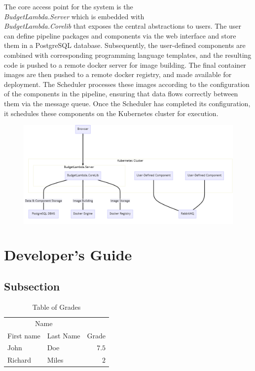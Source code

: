\documentclass[fleqn,10pt]{SelfArx} %
\begin{document}
The core access point for the system is the \\ \emph{BudgetLambda.Server} which is embedded with \\ \emph{BudgetLambda.Corelib} that exposes the central abstractions to users. The user can define pipeline packages and components via the web interface and store them in a PostgreSQL database. Subsequently, the user-defined components are combined with corresponding programming language templates, and the resulting code is pushed to a remote docker server for image building. The final container images are then pushed to a remote docker registry, and made available for deployment. The Scheduler processes these images according to the configuration of the components in the pipeline, ensuring that data flows correctly between them via the message queue. Once the Scheduler has completed its configuration, it schedules these components on the Kubernetes cluster for execution.

\begin{figure}
	\includegraphics[width=\textwidth]{fig1}
\end{figure}



\section{Developer's Guide}

\lipsum[10] %

\subsection{Subsection}

\lipsum[11] %

\begin{table}[hbt]
	\caption{Table of Grades}
	\centering
	\begin{tabular}{llr}
		\toprule
		\multicolumn{2}{c}{Name} \\
		\cmidrule(r){1-2}
		First name & Last Name & Grade \\
		\midrule
		John & Doe & $7.5$ \\
		Richard & Miles & $2$ \\
		\bottomrule
	\end{tabular}
	\label{tab:label}
\end{table}
\end{document}
